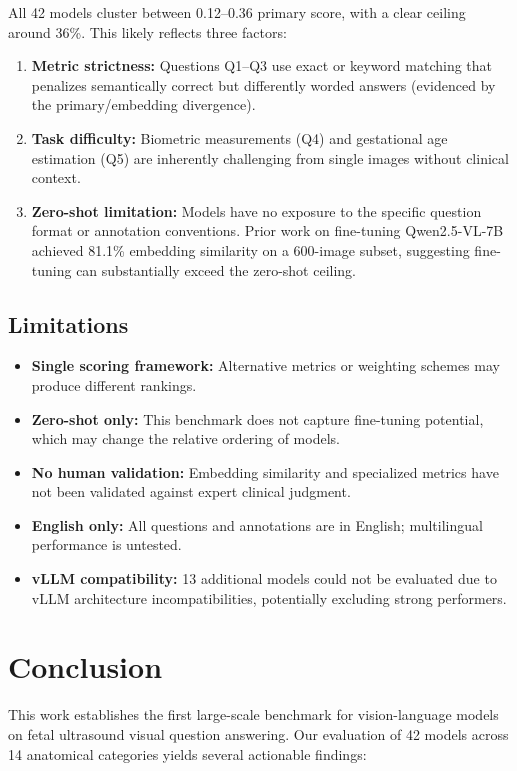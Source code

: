 \documentclass[11pt,a4paper]{article}
\begin{document}
All 42 models cluster between 0.12--0.36 primary score, with a clear ceiling around 36\%. This likely reflects three factors:

\begin{enumerate}
    \item \textbf{Metric strictness:} Questions Q1--Q3 use exact or keyword matching that penalizes semantically correct but differently worded answers (evidenced by the primary/embedding divergence).
    \item \textbf{Task difficulty:} Biometric measurements (Q4) and gestational age estimation (Q5) are inherently challenging from single images without clinical context.
    \item \textbf{Zero-shot limitation:} Models have no exposure to the specific question format or annotation conventions. Prior work on fine-tuning Qwen2.5-VL-7B achieved 81.1\% embedding similarity on a 600-image subset, suggesting fine-tuning can substantially exceed the zero-shot ceiling.
\end{enumerate}

\subsection{Limitations}

\begin{itemize}
    \item \textbf{Single scoring framework:} Alternative metrics or weighting schemes may produce different rankings.
    \item \textbf{Zero-shot only:} This benchmark does not capture fine-tuning potential, which may change the relative ordering of models.
    \item \textbf{No human validation:} Embedding similarity and specialized metrics have not been validated against expert clinical judgment.
    \item \textbf{English only:} All questions and annotations are in English; multilingual performance is untested.
    \item \textbf{vLLM compatibility:} 13 additional models could not be evaluated due to vLLM architecture incompatibilities, potentially excluding strong performers.
\end{itemize}

\section{Conclusion}

This work establishes the first large-scale benchmark for vision-language models on fetal ultrasound visual question answering. Our evaluation of 42 models across 14 anatomical categories yields several actionable findings:
\end{document}
